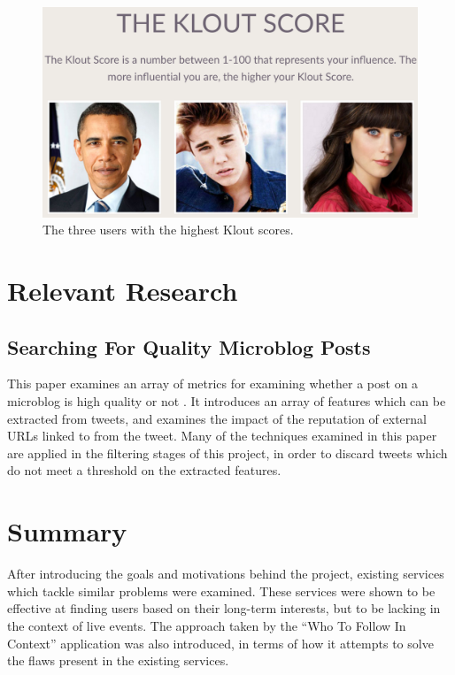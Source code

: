 \documentclass{l4proj}
\begin{document}
\begin{figure}[H]
\centering
\includegraphics[scale=0.3]{klout.png}
\caption{The three users with the highest Klout scores.}
\label{kloutimage}
\end{figure}

\section{Relevant Research}


    \subsection{Searching For Quality Microblog Posts}
    This paper examines an array of metrics for examining whether a post on a microblog is high quality or not \cite{Vosecky2012}. It introduces an array of features which can be extracted from tweets, and examines the impact of the reputation of external URLs linked to from the tweet. Many of the techniques examined in this paper are applied in the filtering stages of this project, in order to discard tweets which do not meet a threshold on the extracted features.
    
\section{Summary}
After introducing the goals and motivations behind the project, existing services which tackle similar problems were examined. These services were shown to be effective at finding users based on their long-term interests, but to be lacking in the context of live events. The approach taken by the ``Who To Follow In Context'' application was also introduced, in terms of how it attempts to solve the flaws present in the existing services.
\end{document}
